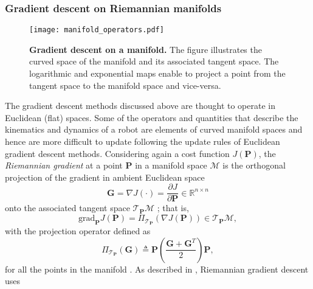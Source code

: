 \subsubsection{Gradient descent on Riemannian manifolds}
\begin{figure*}[!t]
	\centering	
	\hspace*{\fill}
	\texttt{[image: manifold\_operators.pdf]}
	\hspace*{\fill}	
	\caption[] {\label{fig:manifold_operators}\textbf{Gradient descent on a manifold.} The figure illustrates the curved space of the manifold and its associated tangent space. The logarithmic and exponential maps enable to project a point from the tangent space to the manifold space and vice-versa.}
\end{figure*}
The gradient descent methods discussed above are thought to operate in Euclidean (flat) spaces. Some of the operators and quantities that describe the kinematics and dynamics of a robot are elements of curved manifold spaces and hence are more difficult to update following the update rules of Euclidean gradient descent methods. Considering again a cost function $J\left(\bm{P}\right)$, the \emph{Riemannian gradient} at a point $\bm{P}$ in a manifold space $\mathcal{M}$ is the orthogonal projection of the gradient in ambient Euclidean space
\begin{equation}
	\bm{G} = \nabla J(\cdot)=\frac{\partial J}{\partial \bm{P}}\in \mathbb{R}^{n \times n}
\end{equation}
onto the associated tangent space $\mathcal{T}_{\bm{P}}\mathcal{M}$ \cite{Boumal2014Optimizationestimationmanifolds.}; that is,
\begin{equation}
	\text{grad}_{\bm{P}}J(\bm{P}) = \Pi_{ \mathcal{T}_{\bm{P}}}\left(\nabla J(\bm{P})\right) \in \mathcal{T}_{\bm{P}}\mathcal{M},
\end{equation} 
with the projection operator defined as
\begin{equation}
	\Pi_{ \mathcal{T}_{\bm{P}}}(\bm{G})\triangleq\bm{P}\left(\frac{\bm{G}+\bm{G}^T}{2}\right)\bm{P},
\end{equation} 
for all the points in the manifold \cite{Brooks2019Riemannianbatchnormalization}. As described in \cite{Bonnabel2013Stochasticgradientdescent}, Riemannian gradient descent uses
